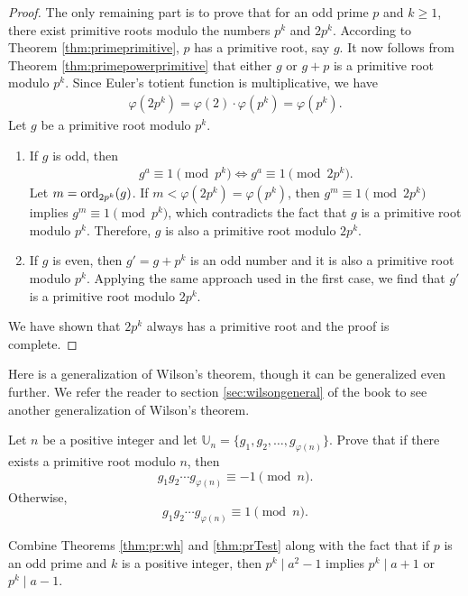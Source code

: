 \documentclass{subfile}
\begin{document}
\begin{proof}
		The only remaining part is to prove that for an odd prime $p$ and $k \geq 1$, there exist primitive roots modulo the numbers $p^k$ and $2p^k$. According to Theorem \ref{thm:primeprimitive}, $p$ has a primitive root, say $g$. It now follows from Theorem \ref{thm:primepowerprimitive} that either $g$ or $g+p$ is a primitive root modulo $p^k$. Since Euler's totient function is multiplicative, we have
			\begin{align*}
				\varphi(2p^k) = \varphi(2)\cdot \varphi(p^k) = \varphi(p^k).
			\end{align*}
		Let $g$ be a primitive root modulo $p^k$. 
		\begin{enumerate}
			\item If $g$ is odd, then
			\begin{align*}
			g^a \equiv 1 \pmod{p^k} \iff g^a \equiv 1 \pmod{2p^k}.
			\end{align*} 
			Let $m = \operatorname{ord}_{2p^k}(g)$. If $m<\varphi(2p^k)=\varphi(p^k)$, then $g^m \equiv 1\pmod{2p^k}$ implies $g^m \equiv 1\pmod{p^k}$, which contradicts the fact that $g$ is a primitive root modulo $p^k$. Therefore, $g$ is also a primitive root modulo $2p^k$. 
			\item If $g$ is even, then $g'=g+p^k$ is an odd number and it is also a primitive root modulo $p^k$. Applying the same approach used in the first case, we find that $g'$ is a primitive root modulo $2p^k$.
		\end{enumerate}
		We have shown that $2p^k$ always has a primitive root and the proof is complete.
	\end{proof}

Here is a generalization of Wilson's theorem, though it can be generalized even further. We refer the reader to section \eqref{sec:wilsongeneral} of the book to see another generalization of Wilson's theorem.
	\begin{problem}\label{thm:genWilson}
		Let $n$ be a positive integer and let $\mathbb U_n = \{g_1, g_2, \ldots, g_{\varphi(n)}\}$. Prove that if there exists a primitive root modulo $n$, then 
		\[g_1g_2\cdots g_{\varphi(n)}\equiv-1\pmod n.\]
		Otherwise, 
		\[g_1g_2\cdots g_{\varphi(n)}\equiv1\pmod n.\]
	\end{problem}
	
	\begin{hint}
		Combine Theorems \ref{thm:pr:wh} and \ref{thm:prTest} along with the fact that if $p$ is an odd prime and $k$ is a positive integer, then $p^k \mid a^2-1$ implies $p^k \mid a+1$ or $p^k\mid a-1$.
	\end{hint}
	
\end{document}
